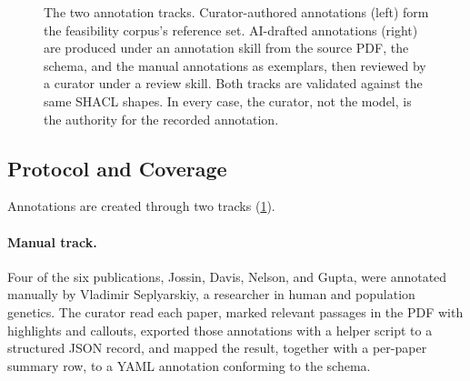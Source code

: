 \begin{figure}[tbp]
  \centering
  \caption{The two annotation tracks. Curator-authored annotations
  (left) form the feasibility corpus's reference set. AI-drafted annotations (right) are
  produced under an annotation skill from the source PDF, the schema, and
  the manual annotations as exemplars, then reviewed by a curator under a
  review skill. Both tracks are validated against the same SHACL shapes.
  In every case, the curator, not the model, is the authority for the
  recorded annotation.}
  \label{fig:workflow}
\end{figure}

\subsection{Protocol and Coverage}
\label{sec:workflow-protocol}

Annotations are created through two tracks (\cref{fig:workflow}).

\paragraph{Manual track.}
Four of the six publications, Jossin, Davis, Nelson, and Gupta, were
annotated manually by Vladimir Seplyarskiy, a researcher in human and
population genetics. The curator read each paper, marked relevant
passages in the PDF with highlights and callouts, exported those
annotations with a helper script to a structured JSON record, and mapped
the result, together with a per-paper summary row, to a YAML annotation
conforming to the schema.

